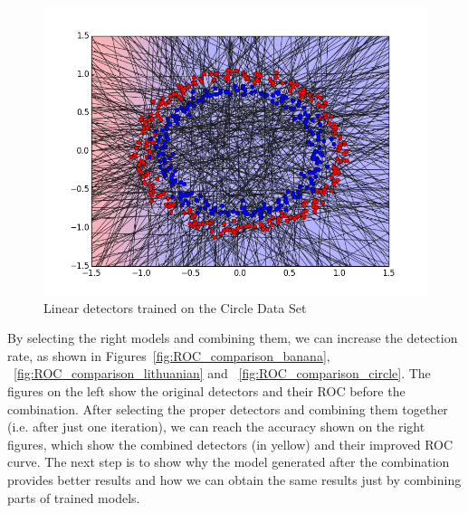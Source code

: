 \begin{figure}[H]
\centering
\includegraphics[scale=0.6]{figs/AllClassifiersCircle}
\caption{Linear detectors trained on the Circle Data Set}
\label{Figure::circle_all}
\end{figure}

By selecting the right models and combining them, we can increase the detection rate, as shown in Figures~\ref{fig:ROC_comparison_banana}, ~\ref{fig:ROC_comparison_lithuanian} and ~\ref{fig:ROC_comparison_circle}. The figures on the left show the original detectors and their ROC before the combination. After selecting the proper detectors and combining them together (i.e. after just one iteration), we can reach the accuracy shown on the right figures, which show the combined detectors (in yellow) and their improved ROC curve. The next step is to show why the model generated after the combination provides better results and how we can obtain the same results just by combining parts of trained models.



